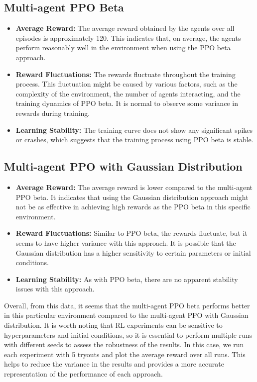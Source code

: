 \subsection{Multi-agent PPO Beta}\label{subsec:multi-agent-ppo-beta}
\begin{itemize}
    \item \textbf{Average Reward:} The average reward obtained by the agents over all episodes is approximately 120. This indicates that, on average, the agents perform reasonably well in the environment when using the PPO beta approach.
    \item \textbf{Reward Fluctuations:} The rewards fluctuate throughout the training process. This fluctuation might be caused by various factors, such as the complexity of the environment, the number of agents interacting, and the training dynamics of PPO beta. It is normal to observe some variance in rewards during training.
    \item \textbf{Learning Stability:} The training curve does not show any significant spikes or crashes, which suggests that the training process using PPO beta is stable.
\end{itemize}
\subsection{Multi-agent PPO with Gaussian Distribution}\label{subsec:multi-agent-ppo-with-gaussian-distribution}
\begin{itemize}
    \item \textbf{Average Reward:} The average reward is lower compared to the multi-agent PPO beta. It indicates that using the Gaussian distribution approach might not be as effective in achieving high rewards as the PPO beta in this specific environment.
    \item \textbf{Reward Fluctuations:} Similar to PPO beta, the rewards fluctuate, but it seems to have higher variance with this approach. It is possible that the Gaussian distribution has a higher sensitivity to certain parameters or initial conditions.
    \item \textbf{Learning Stability:} As with PPO beta, there are no apparent stability issues with this approach.
\end{itemize}
Overall, from this data, it seems that the multi-agent PPO beta performs better in this particular environment compared to the multi-agent PPO with Gaussian distribution.
It is worth noting that RL experiments can be sensitive to hyperparameters and initial conditions, so it is essential to perform multiple runs with different seeds to assess the robustness of the results. In this case, we run each experiment with 5 tryouts and plot the average reward over all runs. This helps to reduce the variance in the results and provides a more accurate representation of the performance of each approach.

